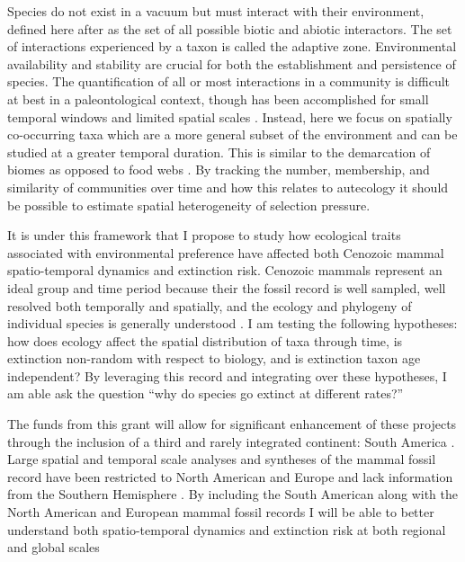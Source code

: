 \documentclass[11pt,letterpaper]{article}
\begin{document}
Species do not exist in a vacuum but must interact with their environment, defined here after \citet{Simpson1944} as the set of all possible biotic and abiotic interactors. The set of interactions experienced by a taxon is called the adaptive zone. Environmental availability and stability are crucial for both the establishment and persistence of species. The quantification of all or most interactions in a community is difficult at best in a paleontological context, though has been accomplished for small temporal windows and limited spatial scales \citep{Angielczyk2005,Mitchell2012,Roopnarine2007}. Instead, here we focus on spatially co-occurring taxa which are a more general subset of the environment and can be studied at a greater temporal duration. This is similar to the demarcation of biomes as opposed to food webs \citep{Vilhena2013b}. By tracking the number, membership, and similarity of communities over time and how this relates to autecology it should be possible to estimate spatial heterogeneity of selection pressure.

It is under this framework that I propose to study how ecological traits associated with environmental preference have affected both Cenozoic mammal spatio-temporal dynamics and extinction risk. Cenozoic mammals represent an ideal group and time period because their the fossil record is well sampled, well resolved both temporally and spatially, and the ecology and phylogeny of individual species is generally understood \citep{Alroy2009,Alroy2000g,Jernvall2002,Liow2008,Smith2004}. I am testing the following hypotheses: how does ecology affect the spatial distribution of taxa through time, is extinction non-random with respect to biology, and is extinction taxon age independent? By leveraging this record and integrating over these hypotheses, I am able ask the question ``why do species go extinct at different rates?''

The funds from this grant will allow for significant enhancement of these projects through the inclusion of a third and rarely integrated continent: South America \citep{Stromberg2013,Marshall1982}. Large spatial and temporal scale analyses and syntheses of the mammal fossil record have been restricted to North American and Europe and lack information from the Southern Hemisphere \citep{Jernvall2004,Jernvall2002,Fortelius2002,Janis2000,Alroy1996a,Alroy1998,Alroy2000g,Liow2008,Raia2006,Tomiya2013}. By including the South American along with the North American and European mammal fossil records I will be able to better understand both spatio-temporal dynamics and extinction risk at both regional and global scales
\end{document}
